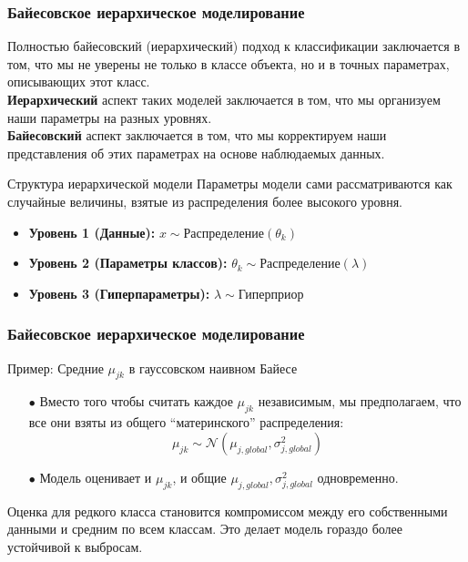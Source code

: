 \documentclass[notheorems, handout]{beamer}
\begin{document}
\begin{frame}
  \frametitle{Байесовское иерархическое моделирование}
  Полностью байесовский (иерархический) подход к классификации
  заключается в том, что мы не уверены не только в классе объекта, но
  и в точных параметрах, описывающих этот класс.\\
  \textbf{Иерархический} аспект таких моделей заключается в том, что
  мы организуем наши параметры на разных
  уровнях.\\ \textbf{Байесовский} аспект заключается в том, что мы
  корректируем наши представления об этих параметрах на основе
  наблюдаемых данных.

  \begin{block}{Структура иерархической модели}
    Параметры модели сами рассматриваются как случайные величины,
    взятые из распределения более высокого уровня.
    \begin{itemize}
      \item \textbf{Уровень 1 (Данные):} $x \sim \text{Распределение}(\theta_k)$
      \item \textbf{Уровень 2 (Параметры классов):} $\theta_k \sim
        \text{Распределение}(\lambda)$
      \item \textbf{Уровень 3 (Гиперпараметры):} $\lambda \sim
        \text{Гиперприор}$
    \end{itemize}
  \end{block}



\end{frame}
\begin{frame}
  \frametitle{Байесовское иерархическое моделирование}
  \begin{block}{Пример: Средние $\mu_{jk}$ в гауссовском наивном Байесе}
    \begin{itemize}
      \item[$\bullet$] Вместо того чтобы считать каждое $\mu_{jk}$
        независимым, мы предполагаем, что все они взяты из общего
        ``материнского'' распределения:
        $$ \mu_{jk} \sim \mathcal{N}(\mu_{j, global}, \sigma^2_{j, global}) $$
      \item[$\bullet$] Модель оценивает и $\mu_{jk}$, и общие
        $\mu_{j, global}, \sigma^2_{j, global}$ одновременно.
    \end{itemize}
  \end{block}
  Оценка для редкого класса становится компромиссом между его
  собственными данными и средним по всем классам. Это делает модель
  гораздо более устойчивой к выбросам.

\end{frame}
\end{document}
